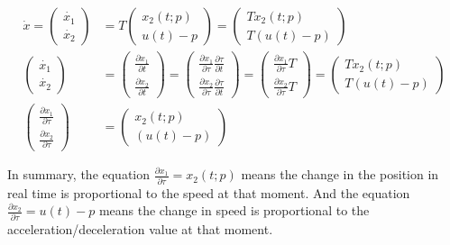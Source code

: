 \documentclass  [
  paper    = a4,
  BCOR     = 10mm,
  twoside,
  fontsize = 12pt,
  fleqn,
  toc      = bibnumbered,
  toc      = listofnumbered,
  numbers  = noendperiod,
  headings = normal,
  listof   = leveldown,
  version  = 3.03
]                                       {scrreprt}
\newcommand{\<}{\langle}
\renewcommand{\>}{\rangle}
\begin{document}
   \begin{subequations}
   	\begin{align}
   	\dot{x} =  \begin{pmatrix} \dot{x_1} \\ \dot{x_2} \end{pmatrix}  & =  T  \begin{pmatrix}  x_2(t;p) \\ u(t)-p   \end{pmatrix} = \begin{pmatrix}  Tx_2(t;p) \\ T(u(t)-p)   \end{pmatrix} \label{eq_difT} \\ 
   	\begin{pmatrix} \dot{x_1} \\ \dot{x_2} \end{pmatrix} &= \begin{pmatrix} \frac{\partial x_1}{\partial t} \\ \frac{\partial x_2}{\partial t} \end{pmatrix} = \begin{pmatrix} \frac{\partial x_1}{\partial \tau} \frac{\partial \tau}{\partial t} \\ \frac{\partial x_2}{\partial \tau} \frac{\partial \tau}{\partial t} \end{pmatrix} =  \begin{pmatrix} \frac{\partial x_1}{\partial \tau} T \\ \frac{\partial x_2}{\partial \tau}T \end{pmatrix} =     \begin{pmatrix}  Tx_2(t;p) \\ T(u(t)-p)   \end{pmatrix} \\
   	\begin{pmatrix} \frac{\partial x_1}{\partial \tau}  \\ \frac{\partial x_2}{\partial \tau} \end{pmatrix} & =     \begin{pmatrix}  x_2(t;p) \\ (u(t)-p)   \end{pmatrix} \label{eq_difTau}
   	\end{align}
   \label{partialX}
   \end{subequations}
   
   In summary, the equation $\frac{\partial x_1}{\partial \tau}= x_2(t;p) $ means the change in the position in real time is proportional to the speed at that moment. And the equation $\frac{\partial x_2}{\partial \tau} = u(t)-p $ means the change in speed is proportional to the acceleration/deceleration value at that moment. 
   
\end{document}
